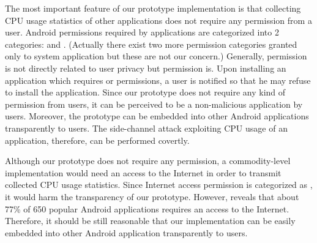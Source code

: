 The most important feature of our prototype implementation is that collecting CPU usage statistics of other applications does not require any permission from a user. 
Android permissions required by applications are categorized into 2 categories:  and .
(Actually there exist two more permission categories granted only to system application but these are not our concern.)
Generally,  permission is not directly related to user privacy but  permission is. 
Upon installing an application which requires  or  permissions, a user is notified so that he may refuse to install the application. 
Since our prototype does not require any kind of permission from users, it can be perceived to be a non-malicious application by users. 
Moreover, the prototype can be embedded into other Android applications transparently to users. 
The side-channel attack exploiting CPU usage of an application, therefore, can be performed covertly.

Although our prototype does not require any permission, a commodity-level implementation would need an access to the Internet in order to transmit collected CPU usage statistics. 
Since Internet access permission is categorized as , it would harm the transparency of our prototype. 
However, \cite{Chia:2012} reveals that about 77\% of 650 popular Android applications requires an access to the Internet. 
Therefore, it should be still reasonable that our implementation can be easily embedded into other Android application transparently to users. 


